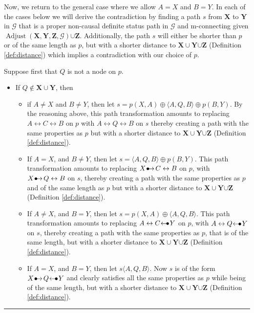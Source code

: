 \documentclass[twoside]{article}
\DeclareMathOperator{\Adjust}{Adjust}
\newcommand{\adjustb}[2][X,Y,Z]{\Adjust(\mb{#1},#2)}
\newcommand{\mb}[1]{\mathbf{#1}}
\newcommand{\g}[1][G]{\mathcal{#1}}
\newenvironment{proofof}[1][]{\begin{trivlist}
\item[\hskip \labelsep {\bfseries Proof of #1.}]}{\hfill\BlackBox\end{trivlist}}
\newcommand{\BlackBox}{\rule{1.5ex}{1.5ex}}
\newcommand{\bulletarrow}{
  \setlength{\unitlength}{1mm}
  \begin{picture}(5,1)(0,0)
    \put(0.2,0){$\bullet$}
    \put(1,0){$\rightarrow$}
  \end{picture}
}
\newcommand{\arrowbullet}{
  \setlength{\unitlength}{1mm}
  \begin{picture}(5,1)(0,0)
    \put(0.2,0){$\leftarrow$}
    \put(3,0){$\bullet$}
  \end{picture}
}
\begin{document}
\begin{proofof}[Lemma \ref{lem:adjust-and-o-pag-helper}]
    Now, we return to the general case where we allow $A = X$ and $B = Y$. In each of the cases below we will derive the contradiction by finding a path $s$ from $\mb{X}$ to $\mb{Y}$ in $\g$ that is a proper non-causal definite status path in $\g$ and m-connecting given $\adjustb{\g} {\cup \mb{Z}}$. Additionally, the path $s$ will either be shorter than $p$ or of the same length as $p$, but with a shorter distance to $\mb{X} \cup \mb{Y} {\cup \mb{Z}}$ (Definition \ref{def:distance}) which implies a contradiction with our choice of $p$.

     Suppose first that $Q$ is not a node on $p$. 
    \begin{itemize}
        \item If $Q \notin \mb{X} \cup \mb{Y}$, then
        \begin{itemize}
            \item if $A \neq X$ and $B \neq Y$, then  let $s= p(X,A) \oplus \langle A,Q,B \rangle \oplus p(B,Y)$. By the reasoning above, this path transformation amounts to replacing $A \leftrightarrow C \leftrightarrow B$ on $p$ with $A \leftrightarrow Q \leftrightarrow B$ on $s$ thereby creating a path with the same properties as $p$ but with a shorter distance to $\mb{X} \cup \mb{Y} {\cup \mb{Z}}$ (Definition \ref{def:distance}).
            \item If $A = X$, and $B \neq Y$, then  let $s = \langle A,Q,B \rangle \oplus p(B,Y)$. This path transformation amounts to replacing $X \bulletarrow C \leftrightarrow B$ on $p$, with $X \bulletarrow Q \leftrightarrow B$ on $s$, thereby creating a path  with the same properties as $p$ and of the same length as $p$ but with a shorter distance  to $\mb{X} \cup \mb{Y} {\cup \mb{Z}}$ (Definition \ref{def:distance}).
            \item If $A \neq X$, and $B = Y$, then let $s = p(X,A) \oplus \langle A,Q,B \rangle $. This path transformation amounts to replacing $A \leftrightarrow C  \arrowbullet Y$ on $p$, with $A \leftrightarrow Q \arrowbullet Y$ on $s$, thereby creating a path  with the same properties as $p$, that is  of the same length, but with a shorter distance  to $\mb{X} \cup \mb{Y} {\cup \mb{Z}}$ (Definition \ref{def:distance}).
            \item If $A = X$, and $B = Y$, then let $s \langle A,Q,B \rangle$. Now $s$ is of the form $X \bulletarrow Q \arrowbullet Y$ and clearly satisfies all the same properties as $p$ while being of the same length, but with a shorter distance  to $\mb{X} \cup \mb{Y} {\cup \mb{Z}}$ (Definition \ref{def:distance}).
        \end{itemize}


\end{itemize}
\end{proofof}
\end{document}
